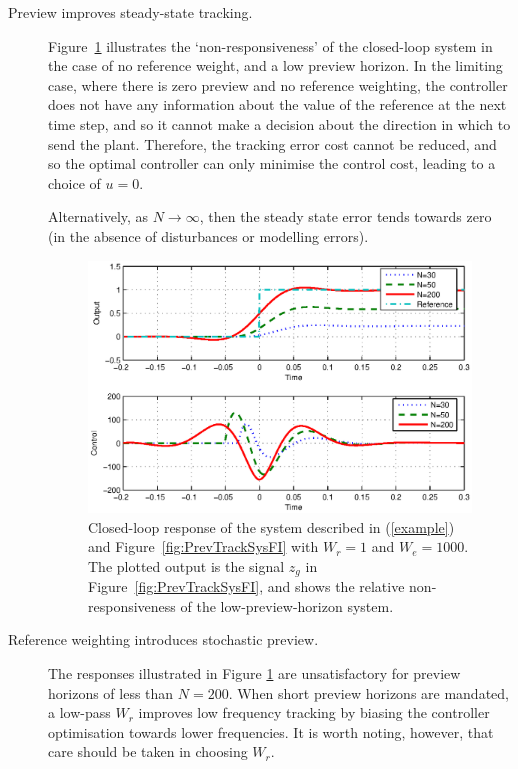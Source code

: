 \documentclass[a4paper,12pt]{article}
\theoremstyle{remark}
\begin{document}
\begin{description}
\item[Preview improves steady-state tracking.] 
Figure~\ref{fig:BetterSSWithIncN} illustrates the `non-responsiveness' of the closed-loop system in the case of no reference weight, and a low preview horizon. In the limiting case, where there is zero preview and no reference weighting, the controller does not have any information about the value of the reference at the next time step, and so it cannot make a decision about the direction in which to send the plant. Therefore, the tracking error cost cannot be reduced, and so the optimal controller can only minimise the control cost, leading to a choice of $u=0$.

Alternatively, as $N\rightarrow \infty$, then the steady state error tends towards zero (in the absence of disturbances or modelling errors). 
\begin{figure}
\includegraphics[width=\columnwidth]{./Fig_9.eps}
\caption{Closed-loop response of the system described in (\ref{example}) and Figure~\ref{fig:PrevTrackSysFI} with $W_r=1$ and $W_e=1000$.
The plotted output is the signal $z_g$ in Figure~\ref{fig:PrevTrackSysFI}, and shows the relative non-responsiveness of the low-preview-horizon system.
\label{fig:BetterSSWithIncN}}
\end{figure}
\item[Reference weighting introduces stochastic preview.] 
The responses illustrated in Figure \ref{fig:BetterSSWithIncN} are unsatisfactory for preview horizons of less than $N=200$. When short preview horizons are mandated, a low-pass $W_r$ improves low frequency tracking by biasing the controller optimisation towards lower frequencies. It is worth noting, however, that care should be taken in choosing $W_r$.

\end{description}
\end{document}
